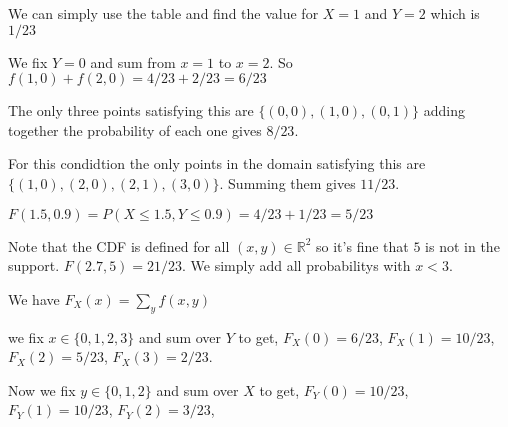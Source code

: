 \documentclass[11pt,largemargins]{homework}
\newcommand{\R}{\mathbb{R}}
\begin{document}
\maketitle

\question

\begin{alphaparts}
    \questionpart 
    We can simply use the table and find the value for $X = 1$ and $Y = 2$ which is $1/23$

    \questionpart 
    We fix $Y = 0$ and sum from $x = 1$ to $x = 2$. So $f(1, 0) + f(2, 0) = 4/23 + 2/23 = 6/23$

    \questionpart 
    The only three points satisfying this are $\{(0, 0), (1, 0), (0, 1) \}$ adding together the probability of each one gives 
    $8/23$. 

    \questionpart 
    For this condidtion the only points in the domain satisfying this are $\{(1, 0), (2, 0), (2, 1), (3, 0) \}$. Summing them gives 
    $11/23$. 

    \questionpart 
    $F(1.5, 0.9) = P(X \leq 1.5, Y \leq 0.9) = 4/23 + 1/23 = 5/23 $ 

    \questionpart 
    Note that the CDF is defined for all $(x, y) \in \R^2$ so it's fine that $5$ is not in the support. $F(2.7, 5) = 21/23$. We simply add 
    all probabilitys with $x < 3$. 
    
    

    
\end{alphaparts}


\question
We have $F_X(x) = \sum_{y} f(x, y) $
\begin{alphaparts}
    \questionpart 
    we fix $x \in \{0, 1, 2, 3\}$ and sum over $Y$ to get, $F_X(0) = 6/23$, $F_X(1) = 10/23$, $F_X(2) = 5/23$, $F_X(3) = 2/23$.
    
    \questionpart 
    Now we fix $y \in \{0 , 1, 2 \}$ and sum over $X$ to get, $F_Y(0) = 10/23$, $F_Y(1) = 10/23$, $F_Y(2) = 3/23$, 

\end{alphaparts}
\end{document}
